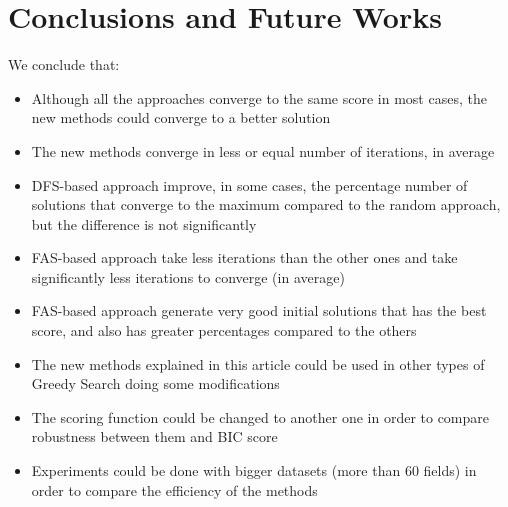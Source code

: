 \section{Conclusions and Future Works}
\label{sec:conclusions}

We conclude that:
\begin{itemize}
	\item Although all the approaches converge to the same score in most cases, the new methods could converge to a better solution
	\item The new methods converge in less or equal number of iterations, in average
	\item DFS-based approach improve, in some cases, the percentage number of solutions that converge to the maximum compared to the random approach, but the difference is not significantly
	\item FAS-based approach take less iterations than the other ones and take significantly less iterations to converge (in average)
	\item FAS-based approach generate very good initial solutions that has the best score, and also  has greater percentages compared to the others
	\item The new methods explained in this article could be used in other types of Greedy Search doing some modifications
	\item The scoring function could be changed to another one in order to compare robustness between them and BIC score
	\item Experiments could be done with bigger datasets (more than 60 fields) in order to compare the efficiency of the methods
\end{itemize}